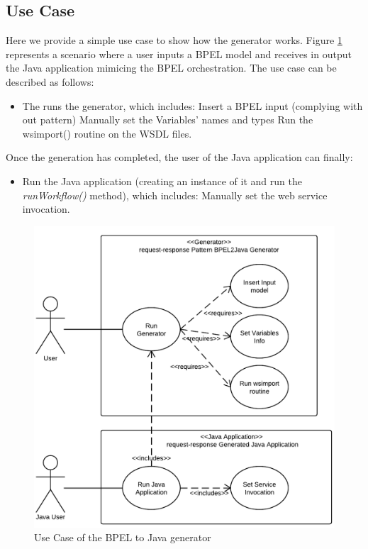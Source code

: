 \subsection{Use Case}
\label{sec:UseCase}
Here we provide a simple use case to show how the generator works. Figure \ref{fig:GeneratorUseCase} represents a scenario where a user inputs a BPEL model and receives in output the Java application mimicing the BPEL orchestration.
The use case can be described as follows:
\begin{itemize}
 \item The runs the generator, which includes:
  \subitem Insert a BPEL input (complying with out pattern) 
  \subitem Manually set the Variables' names and types
  \subitem Run the wsimport() routine on the WSDL files.
\end{itemize}
Once the generation has completed, the user of the Java application can finally:
\begin{itemize} 
 \item Run the Java application (creating an instance of it and run the \textit{runWorkflow()} method), which includes:
  \subitem Manually set the web service invocation.
\end{itemize}

\begin{figure}
  \begin{center}
    \includegraphics[scale=1.5]{pictures/GeneratorUseCase.png}
    \caption{Use Case of the BPEL to Java generator}
    \label{fig:GeneratorUseCase}
  \end{center}
\end{figure}


